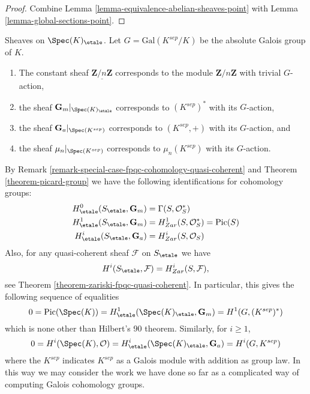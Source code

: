 \begin{proof}
Combine
Lemma \ref{lemma-equivalence-abelian-sheaves-point}
with
Lemma \ref{lemma-global-sections-point}.
\end{proof}

\begin{example}
\label{example-sheaves-point}
Sheaves on $\Spec(K)_\etale$.
Let $G = \text{Gal}(K^{sep}/K)$ be the absolute Galois group of $K$.
\begin{enumerate}
\item The constant sheaf $\underline{\mathbf{Z}/n\mathbf{Z}}$ corresponds to
the module $\mathbf{Z}/n\mathbf{Z}$ with trivial $G$-action,
\item the sheaf $\mathbf{G}_m|_{\Spec(K)_\etale}$ corresponds to
$(K^{sep})^*$ with its $G$-action,
\item the sheaf $\mathbf{G}_a|_{\Spec(K^{sep})}$ corresponds to
$(K^{sep}, +)$ with its $G$-action, and
\item the sheaf $\mu_n|_{\Spec(K^{sep})}$ corresponds to
$\mu_n(K^{sep})$ with its $G$-action.
\end{enumerate}
By
Remark \ref{remark-special-case-fpqc-cohomology-quasi-coherent}
and
Theorem \ref{theorem-picard-group}
we have the following identifications for cohomology groups:
\begin{align*}
H_\etale^0(S_\etale, \mathbf{G}_m) & =
\Gamma(S, \mathcal{O}_S^*) \\
H_\etale^1(S_\etale, \mathbf{G}_m) & =
H_{Zar}^1(S, \mathcal{O}_S^*) = \text{Pic}(S) \\
H_\etale^i(S_\etale, \mathbf{G}_a) & =
H_{Zar}^i(S, \mathcal{O}_S)
\end{align*}
Also, for any quasi-coherent sheaf $\mathcal{F}$ on $S_\etale$ we have
$$
H^i(S_\etale, \mathcal{F}) = H_{Zar}^i(S, \mathcal{F}),
$$
see
Theorem \ref{theorem-zariski-fpqc-quasi-coherent}.
In particular, this gives the following sequence of equalities
$$
0 =
\text{Pic}(\Spec(K)) =
H_\etale^1(\Spec(K)_\etale, \mathbf{G}_m) =
H^1(G, (K^{sep})^*)
$$
which is none other than Hilbert's 90 theorem. Similarly, for $i \geq 1$,
$$
0 = H^i(\Spec(K), \mathcal{O})
= H_\etale^i(\Spec(K)_\etale, \mathbf{G}_a)
= H^i(G, K^{sep})
$$
where the $K^{sep}$ indicates $K^{sep}$ as a Galois module with addition
as group law. In this way we may consider the work we have done so far as
a complicated way of computing Galois cohomology groups.
\end{example}











